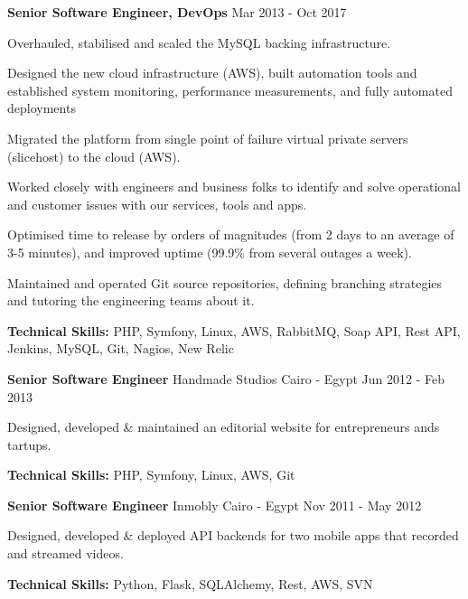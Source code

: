 \begin{cventries}
	\cventry
	{\textbf{Senior Software Engineer, DevOps}} %
	{} %
	{} %
	{Mar 2013 - Oct 2017} %
	{
		\begin{cvitems} %
			\item {Overhauled, stabilised and scaled the MySQL backing infrastructure.}
			\item {Designed the new cloud infrastructure (AWS), built automation tools and established
			            system monitoring, performance measurements, and fully automated deployments}
			\item {Migrated the platform from single point of failure virtual private servers
			            (slicehost) to the cloud (AWS).}
			\item {Worked closely with engineers and business folks to identify and solve operational
			            and customer issues with our services, tools and apps.}
			\item {Optimised time to release by orders of magnitudes (from 2 days to an average of 3-5
			            minutes), and improved uptime (99.9\% from several outages a week).}
			\item {Maintained and operated Git source repositories, defining branching strategies and
			            tutoring the engineering teams about it.}
			\item {\textbf{Technical Skills:} PHP, Symfony, Linux, AWS, RabbitMQ, Soap API, Rest API,
			            Jenkins, MySQL, Git, Nagios, New Relic}
		\end{cvitems}
	}

	\cventry
	{\textbf{Senior Software Engineer}} %
	{Handmade Studios} %
	{Cairo - Egypt} %
	{Jun 2012 - Feb 2013} %
	{
		\begin{cvitems} %
			\item {Designed, developed \& maintained an editorial website for entrepreneurs ands
			            tartups.}
			\item {\textbf{Technical Skills:} PHP, Symfony, Linux, AWS, Git}
		\end{cvitems}
	}

	\cventry
	{\textbf{Senior Software Engineer}} %
	{Inmobly} %
	{Cairo - Egypt} %
	{Nov 2011 - May 2012} %
	{
		\begin{cvitems} %
			\item {Designed, developed \& deployed API backends for two mobile apps that recorded and streamed videos.}
			\item {\textbf{Technical Skills:} Python, Flask, SQLAlchemy, Rest, AWS, SVN}
		\end{cvitems}
	}


\end{cventries}
